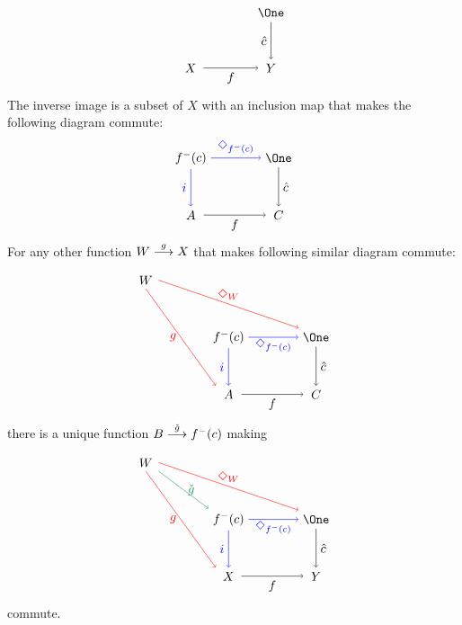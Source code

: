 \[
\begin{tikzpicture}
\matrix (m) [row sep=3em,column sep=4em,minimum width=2em]
{
	& \node (one) {$\One$};\\
	\node (A) {$X$}; & \node (C) {$Y$};\\
};
\draw[->] (A.east) -- node[anchor=north]  {$f$} (C.west) ;
\draw[->] (one.south) -- node[anchor=east]  {$\hat c$} (C.north);
\end{tikzpicture}
\]
The inverse image is a subset of $X$ with an inclusion map that makes the following diagram commute:
\[
\begin{tikzpicture}
\matrix (m) [row sep=3em,column sep=4em,minimum width=2em]
{
	\node (inv) {$f^-(c)$}; & \node (one) {$\One$};\\
	\node (A) {$A$}; & \node (C) {$C$};\\
};
\draw[->] (A.east) -- node[anchor=north]  {$f$} (C.west) ;
\draw[->] (one.south) -- node[anchor=west]  {$\hat c$} (C.north);
\draw[->,blue] (inv.south) -- node[anchor=east] {$i$} (A.north);
\draw[->,blue] (inv.east) -- node[anchor=south] {$\Diamond_{f^-(c)}$} (one.west);
\end{tikzpicture}
\]
For any other function $\sfromto gWX$ that makes following similar diagram commute:
\[
\begin{tikzpicture}
\matrix (m) [row sep=3em,column sep=4em,minimum width=2em]
{
	\node (B) {$W$};\\
	&\node (inv) {$f^-(c)$}; & \node (one) {$\One$};\\
	&\node (A) {$A$}; & \node (C) {$C$};\\
};
\draw[->] (A.east) -- node[anchor=north]  {$f$} (C.west) ;
\draw[->] (one.south) -- node[anchor=west]  {$\hat c$} (C.north);
\draw[->,blue] (inv.south) -- node[anchor=east] {$i$} (A.north);
\draw[->,blue] (inv.east) -- node[anchor=north] {$\Diamond_{f^-(c)}$} (one.west);
\draw[->,red] (B.south) -- node[anchor=east] {$g$} (A.north west);
\draw[->,red] (B.east) -- node[anchor=south] {$\Diamond_W$} (one.north west);
\end{tikzpicture}
\]
there is a unique function $\sfromto {\check g}B{f^-(c)}$ making
\[
\begin{tikzpicture}
\matrix (m) [row sep=3em,column sep=4em,minimum width=2em]
{
	\node (B) {$W$};\\
	&\node (inv) {$f^-(c)$}; & \node (one) {$\One$};\\
	&\node (A) {$X$}; & \node (C) {$Y$};\\
};
\draw[->] (A.east) -- node[anchor=north]  {$f$} (C.west) ;
\draw[->] (one.south) -- node[anchor=west]  {$\hat c$} (C.north);
\draw[->,blue] (inv.south) -- node[anchor=east] {$i$} (A.north);
\draw[->,blue] (inv.east) -- node[anchor=north] {$\Diamond_{f^-(c)}$} (one.west);
\draw[->,red] (B.south) -- node[anchor=east] {$g$} (A.north west);
\draw[->,red] (B.east) -- node[anchor=south] {$\Diamond_W$} (one.north west);
\draw[->, ForestGreen] (B.south east) -- node[anchor=west] {$\check g$} (inv.north west);
\end{tikzpicture}
\]
commute.

